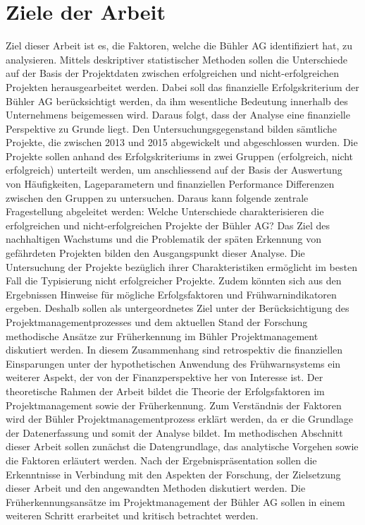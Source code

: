 \section{Ziele der Arbeit}\label{sec:zda}
Ziel dieser Arbeit ist es, die Faktoren, welche die Bühler AG identifiziert hat, zu analysieren. Mittels deskriptiver statistischer Methoden sollen die Unterschiede auf der Basis der Projektdaten zwischen erfolgreichen und nicht-erfolgreichen Projekten herausgearbeitet werden. Dabei soll das finanzielle Erfolgskriterium der Bühler AG berücksichtigt werden, da ihm wesentliche Bedeutung innerhalb des Unternehmens beigemessen wird. Daraus folgt, dass der Analyse eine finanzielle Perspektive zu Grunde liegt. Den Untersuchungsgegenstand bilden sämtliche Projekte, die zwischen 2013 und 2015 abgewickelt und abgeschlossen wurden. Die Projekte sollen anhand des Erfolgskriteriums in zwei Gruppen (erfolgreich, nicht erfolgreich) unterteilt  werden, um anschliessend auf der Basis der Auswertung von  Häufigkeiten, Lageparametern und finanziellen Performance Differenzen zwischen den Gruppen zu untersuchen. Daraus kann folgende zentrale Fragestellung abgeleitet werden: 
\newline\newline
Welche Unterschiede charakterisieren die erfolgreichen und nicht-erfolgreichen Projekte der Bühler AG?
\newline\newline
Das Ziel des nachhaltigen Wachstums und die Problematik der späten Erkennung von gefährdeten Projekten bilden den Ausgangspunkt dieser Analyse. Die Untersuchung der Projekte bezüglich ihrer Charakteristiken ermöglicht im besten Fall die Typisierung nicht erfolgreicher Projekte. Zudem könnten sich aus den Ergebnissen Hinweise für mögliche Erfolgsfaktoren und Frühwarnindikatoren ergeben. Deshalb sollen als untergeordnetes Ziel unter der Berücksichtigung des Projektmanagementprozesses und dem aktuellen Stand der Forschung methodische Ansätze zur Früherkennung im Bühler Projektmanagement diskutiert werden. In diesem Zusammenhang sind retrospektiv die finanziellen Einsparungen unter der hypothetischen Anwendung des Frühwarnsystems ein weiterer Aspekt, der von der Finanzperspektive her von Interesse ist. 
\newline\newline
Der theoretische Rahmen der Arbeit bildet die Theorie der Erfolgsfaktoren im Projektmanagement sowie der Früherkennung. Zum Verständnis der Faktoren wird der Bühler Projektmanagementprozess erklärt werden, da er die Grundlage der Datenerfassung und somit der Analyse bildet. Im methodischen Abschnitt dieser Arbeit sollen zunächst die Datengrundlage, das analytische Vorgehen sowie die Faktoren erläutert werden. Nach der Ergebnispräsentation sollen die Erkenntnisse in Verbindung mit den Aspekten der Forschung, der Zielsetzung dieser Arbeit und den angewandten Methoden diskutiert werden. Die Früherkennungsansätze im Projektmanagement der Bühler AG sollen in einem weiteren Schritt erarbeitet und kritisch betrachtet werden.
